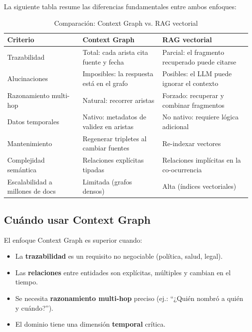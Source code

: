 \documentclass[12pt,a4paper]{article}
\begin{document}
La siguiente tabla resume las diferencias fundamentales entre ambos enfoques:

\begin{table}[H]
\centering
\small
\caption{Comparación: Context Graph vs. RAG vectorial}
\label{tab:comparacion}
\begin{tabular}{>{\raggedright\arraybackslash}p{3cm} >{\raggedright\arraybackslash}p{5.2cm} >{\raggedright\arraybackslash}p{5.2cm}}
\toprule
\textbf{Criterio} & \textbf{Context Graph} & \textbf{RAG vectorial} \\
\midrule
Trazabilidad & Total: cada arista cita fuente y fecha & Parcial: el fragmento recuperado puede citarse \\
Alucinaciones & Imposibles: la respuesta está en el grafo & Posibles: el LLM puede ignorar el contexto \\
Razonamiento multi-hop & Natural: recorrer aristas & Forzado: recuperar y combinar fragmentos \\
Datos temporales & Nativo: metadatos de validez en aristas & No nativo: requiere lógica adicional \\
Mantenimiento & Regenerar tripletes al cambiar fuentes & Re-indexar vectores \\
Complejidad semántica & Relaciones explícitas tipadas & Relaciones implícitas en la co-ocurrencia \\
Escalabilidad a millones de docs & Limitada (grafos densos) & Alta (índices vectoriales) \\
\bottomrule
\end{tabular}
\end{table}

\subsection{Cuándo usar Context Graph}

El enfoque Context Graph es superior cuando:

\begin{itemize}
  \item La \textbf{trazabilidad} es un requisito no negociable (política, salud, legal).
  \item Las \textbf{relaciones} entre entidades son explícitas, múltiples y cambian en el tiempo.
  \item Se necesita \textbf{razonamiento multi-hop} preciso (ej.: ``¿Quién nombró a quién y cuándo?'').
  \item El dominio tiene una dimensión \textbf{temporal} crítica.
\end{itemize}
\end{document}
